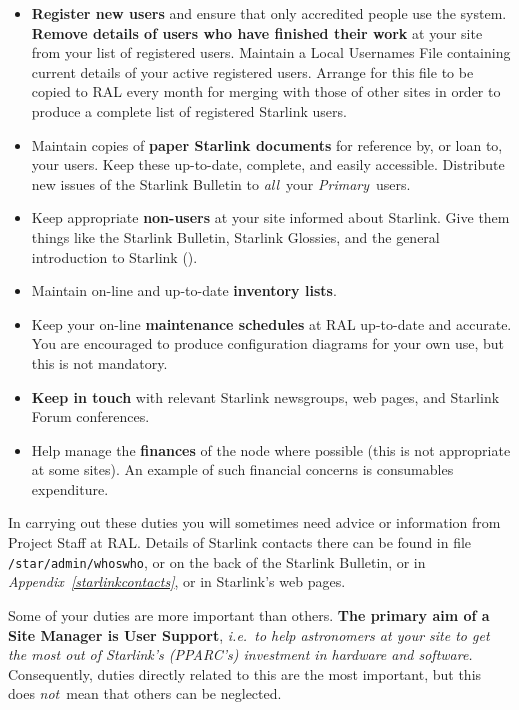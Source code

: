 \begin{itemize}
\item {\bf Register new users} and ensure that only accredited people use the
system.
{\bf Remove details of users who have finished their work} at your site from
your list of registered users.
Maintain a Local Usernames File containing current details of your active
registered users.
Arrange for this file to be copied to RAL every month for merging with those of
other sites in order to produce a complete list of registered Starlink users.

\item Maintain copies of {\bf paper Starlink documents} for reference by, or
loan to, your users.
Keep these up-to-date, complete, and easily accessible.
Distribute new issues of the Starlink Bulletin to {\em all}\, your
{\em Primary}\, users.

\item Keep appropriate {\bf non-users} at your site informed about Starlink.
Give them things like the Starlink Bulletin, Starlink Glossies, and the
general introduction to Starlink
().

\item Maintain on-line and up-to-date {\bf inventory lists}.

\item Keep your on-line {\bf maintenance schedules} at RAL up-to-date and
accurate.
You are encouraged to produce configuration diagrams for your own use,
but this is not mandatory.

\item {\bf Keep in touch} with relevant Starlink newsgroups, web pages, and
Starlink Forum conferences.

\item Help manage the {\bf finances} of the node where possible (this is not
appropriate at some sites).
An example of such financial concerns is consumables expenditure.

\end{itemize}

In carrying out these duties you will sometimes need advice or information
from Project Staff at RAL.
Details of Starlink contacts there can be found in file
{\tt /star/admin/whoswho}, or on the back of the Starlink Bulletin, or in
{\em Appendix~\ref{starlinkcontacts}},
or in Starlink's web pages.

Some of your duties are more important than others.
{\bf The primary aim of a Site Manager is User Support}, {\em i.e.\ to
help astronomers at your site to get the most out of Starlink's (PPARC's)
investment in hardware and software.} 
Consequently, duties directly related to this are the most important, but this
does {\em not}\, mean that others can be neglected.
 
